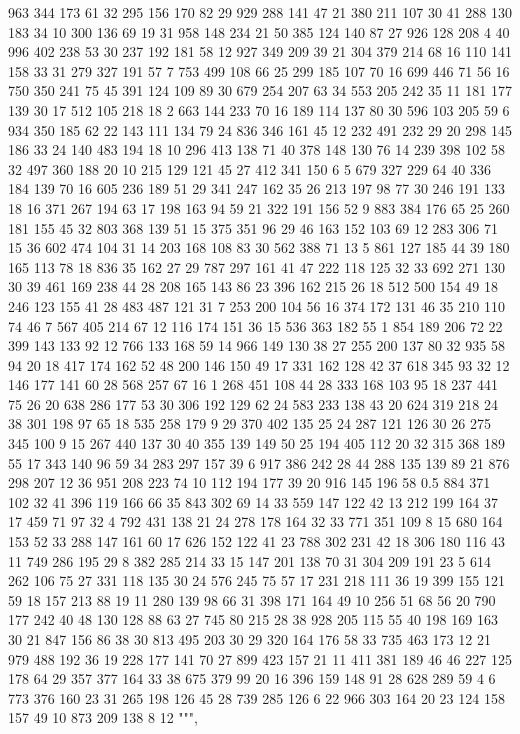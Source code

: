 \begin{pyverbatim}
{	963	344	173	61	32	295	156	170	82	29	929	288	141	47	21
	380	211	107	30	41	288	130	183	34	10	300	136	69	19	31
	958	148	234	21	50	385	124	140	87	27	926	128	208	4	40
	996	402	238	53	30	237	192	181	58	12	927	349	209	39	21
	304	379	214	68	16	110	141	158	33	31	279	327	191	57	7
	753	499	108	66	25	299	185	107	70	16	699	446	71	56	16
	750	350	241	75	45	391	124	109	89	30	679	254	207	63	34
	553	205	242	35	11	181	177	139	30	17	512	105	218	18	2
	663	144	233	70	16	189	114	137	80	30	596	103	205	59	6
	934	350	185	62	22	143	111	134	79	24	836	346	161	45	12
	232	491	232	29	20	298	145	186	33	24	140	483	194	18	10
	296	413	138	71	40	378	148	130	76	14	239	398	102	58	32
	497	360	188	20	10	215	129	121	45	27	412	341	150	6	5
	679	327	229	64	40	336	184	139	70	16	605	236	189	51	29
	341	247	162	35	26	213	197	98	77	30	246	191	133	18	16
	371	267	194	63	17	198	163	94	59	21	322	191	156	52	9
	883	384	176	65	25	260	181	155	45	32	803	368	139	51	15
	375	351	96	29	46	163	152	103	69	12	283	306	71	15	36
	602	474	104	31	14	203	168	108	83	30	562	388	71	13	5
	861	127	185	44	39	180	165	113	78	18	836	35	162	27	29
	787	297	161	41	47	222	118	125	32	33	692	271	130	30	39
	461	169	238	44	28	208	165	143	86	23	396	162	215	26	18
	512	500	154	49	18	246	123	155	41	28	483	487	121	31	7
	253	200	104	56	16	374	172	131	46	35	210	110	74	46	7
	567	405	214	67	12	116	174	151	36	15	536	363	182	55	1
	854	189	206	72	22	399	143	133	92	12	766	133	168	59	14
	966	149	130	38	27	255	200	137	80	32	935	58	94	20	18
	417	174	162	52	48	200	146	150	49	17	331	162	128	42	37
	618	345	93	32	12	146	177	141	60	28	568	257	67	16	1
	268	451	108	44	28	333	168	103	95	18	237	441	75	26	20
	638	286	177	53	30	306	192	129	62	24	583	233	138	43	20
	624	319	218	24	38	301	198	97	65	18	535	258	179	9	29
	370	402	135	25	24	287	121	126	30	26	275	345	100	9	15
	267	440	137	30	40	355	139	149	50	25	194	405	112	20	32
	315	368	189	55	17	343	140	96	59	34	283	297	157	39	6
	917	386	242	28	44	288	135	139	89	21	876	298	207	12	36
	951	208	223	74	10	112	194	177	39	20	916	145	196	58	0.5
	884	371	102	32	41	396	119	166	66	35	843	302	69	14	33
	559	147	122	42	13	212	199	164	37	17	459	71	97	32	4
	792	431	138	21	24	278	178	164	32	33	771	351	109	8	15
	680	164	153	52	33	288	147	161	60	17	626	152	122	41	23
	788	302	231	42	18	306	180	116	43	11	749	286	195	29	8
	382	285	214	33	15	147	201	138	70	31	304	209	191	23	5
	614	262	106	75	27	331	118	135	30	24	576	245	75	57	17
	231	218	111	36	19	399	155	121	59	18	157	213	88	19	11
	280	139	98	66	31	398	171	164	49	10	256	51	68	56	20
	790	177	242	40	48	130	128	88	63	27	745	80	215	28	38
	928	205	115	55	40	198	169	163	30	21	847	156	86	38	30
	813	495	203	30	29	320	164	176	58	33	735	463	173	12	21
	979	488	192	36	19	228	177	141	70	27	899	423	157	21	11
	411	381	189	46	46	227	125	178	64	29	357	377	164	33	38
	675	379	99	20	16	396	159	148	91	28	628	289	59	4	6
	773	376	160	23	31	265	198	126	45	28	739	285	126	6	22
	966	303	164	20	23	124	158	157	49	10	873	209	138	8	12
	""",

}
\end{pyverbatim}
